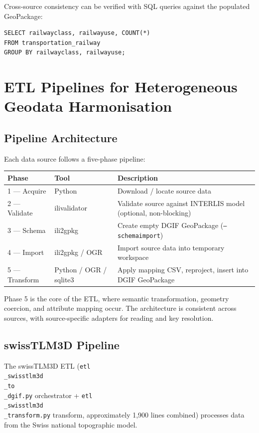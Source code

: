 \documentclass[conference]{IEEEtran}
\begin{document}
Cross-source consistency can be verified with SQL queries against the populated GeoPackage:

\begin{lstlisting}
SELECT railwayclass, railwayuse, COUNT(*)
FROM transportation_railway
GROUP BY railwayclass, railwayuse;
\end{lstlisting}




\section{ETL Pipelines for Heterogeneous Geodata Harmonisation}

\subsection{Pipeline Architecture}

Each data source follows a five-phase pipeline:

\begin{center}
\begin{longtable}{p{}p{}p{}}
Phase & Tool & Description \\
\midrule
1 — Acquire & Python & Download / locate source data \\
2 — Validate & ilivalidator & Validate source against INTERLIS model (optional, non-blocking) \\
3 — Schema & ili2gpkg & Create empty DGIF GeoPackage (\texttt{--schemaimport}) \\
4 — Import & ili2gpkg / OGR & Import source data into temporary workspace \\
5 — Transform & Python / OGR / sqlite3 & Apply mapping CSV, reproject, insert into DGIF GeoPackage \\
\end{longtable}
\end{center}


Phase 5 is the core of the ETL, where semantic transformation, geometry coercion, and attribute mapping occur. The architecture is consistent across sources, with source-specific adapters for reading and key resolution.

\subsection{swissTLM3D Pipeline}

The swissTLM3D ETL (\texttt{etl\\_swisstlm3d\\_to\\_dgif.py} orchestrator + \texttt{etl\\_swisstlm3d\\_transform.py} transform, approximately 1,900 lines combined) processes data from the Swiss national topographic model.
\end{document}
